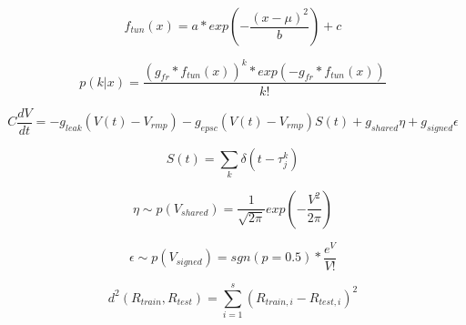 \documentclass{article}
\begin{document}
\begin{equation}
f_{tun}(x) = a * exp{\left( -\frac{(x-\mu)^{2}}{b} \right)} + c
\end{equation}

\begin{equation}
p(k | x) = \frac{(g_{fr}*f_{tun}(x))^{k} * exp{\left(-g_{fr}*f_{tun}(x)\right)}}{k!}
\end{equation}

\begin{equation}
C\frac{dV}{dt} = - g_{leak}(V(t) - V_{rmp}) - g_{epsc}(V(t) - V_{rmp})S(t) + g_{shared}\eta + g_{signed}\epsilon
\end{equation}

\begin{equation}
S(t) = \sum_{k} \delta(t-\tau_{j}^{k})
\end{equation}

\begin{equation}
\eta \sim p(V_{shared}) = \frac{1}{\sqrt{2\pi}} exp{\left(-\frac{V^{2}}{2\pi} \right)}
\end{equation}


\begin{equation}
\epsilon \sim p(V_{signed}) = sgn(p=0.5) * \frac{e^{V}}{V!}
\end{equation}

\begin{equation}
d^{2}(R_{train},R_{test}) = \sum_{i=1}^{s} (R_{train,i} - R_{test,i})^{2}
\end{equation}

	
\end{document}
